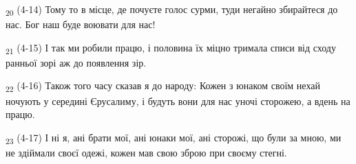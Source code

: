 \begin{tcolorbox}
\textsubscript{20} (4-14) Тому то в місце, де почуєте голос сурми, туди негайно збирайтеся до нас. Бог наш буде воювати для нас!
\end{tcolorbox}
\begin{tcolorbox}
\textsubscript{21} (4-15) І так ми робили працю, і половина їх міцно тримала списи від сходу ранньої зорі аж до появлення зір.
\end{tcolorbox}
\begin{tcolorbox}
\textsubscript{22} (4-16) Також того часу сказав я до народу: Кожен з юнаком своїм нехай ночують у середині Єрусалиму, і будуть вони для нас уночі сторожею, а вдень на працю.
\end{tcolorbox}
\begin{tcolorbox}
\textsubscript{23} (4-17) І ні я, ані брати мої, ані юнаки мої, ані сторожі, що були за мною, ми не здіймали своєї одежі, кожен мав свою зброю при своєму стегні.
\end{tcolorbox}
